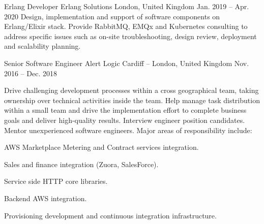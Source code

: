 \begin{cventries}
  \cventry
    {Erlang Developer} %
    {Erlang Solutions} %
    {London, United Kingdom} %
    {Jan. 2019 – Apr. 2020} %
    {
      \responsibilities
        {Design, implementation and support of software components
          on Erlang/Elixir stack. Provide RabbitMQ, EMQx and
          Kubernetes consulting to address specific issues such as on-site
          troubleshooting, design review, deployment and scalability
          planning.}
    }

  \cventry
    {Senior Software Engineer} %
    {Alert Logic} %
    {Cardiff -- London, United Kingdom} %
    {Nov. 2016 – Dec. 2018} %
    {
      \responsibilities
        {Drive challenging development processes within a cross
        geographical team, taking ownership over technical activities
        inside the team. Help manage task distribution within a small
        team and drive the implementation effort to complete business
        goals and deliver high-quality results. Interview engineer
        position candidates. Mentor unexperienced software
        engineers. Major areas of responsibility include:}
      \begin{cvitems} %
        \item {AWS Marketplace Metering and Contract services integration.}
        \item {Sales and finance integration (Zuora, SalesForce).}
        \item {Service side HTTP core libraries.}
        \item {Backend AWS integration.}
        \item {Provisioning development and continuous integration infrastructure.}
      \end{cvitems}
    }


\end{cventries}
